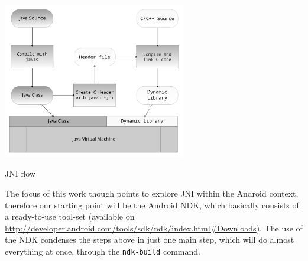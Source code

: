 \documentclass[a4paper,10pt]{article}
\makeatletter
\newenvironment{figurehere}{\def\@captype{figure}\vspace{2ex}}{\vspace{2ex}}
\newcommand{\keyword}[1]{\texttt{#1}}
\makeatother
\begin{document}
\begin{multicols}{2}
\begin{figurehere}
 \centering
 \includegraphics[width=8cm]{./figures/jni-flow.pdf}
 \caption{JNI flow}
 \label{fig:jni-flow}
\end{figurehere}

The focus of this work though points to explore JNI within the Android context,
therefore our starting point will be the Android NDK, which basically consists
of a ready-to-use tool-set (available on
\url{http://developer.android.com/tools/sdk/ndk/index.html#Downloads}). The use
of the NDK condenses the steps above in just one main step, which will do almost
everything at once, through the \keyword{ndk-build} command.



\end{multicols}
\end{document}
